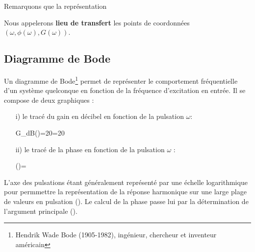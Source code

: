 Remarquons que la représentation 

Nous appelerons \textbf{lieu de transfert} les points de coordonnées $(\omega, \phi(\omega),G(\omega))$.



\subsection{Diagramme de Bode}
Un diagramme de Bode\footnote{Hendrik Wade Bode (1905-1982), ingénieur, chercheur 
et inventeur américain} permet de représenter le comportement fréquentielle 
d'un système quelconque en fonction de la fréquence d'excitation en entrée.
Il se compose de deux graphiques :
\begin{itemize}
    \item[i)] le tracé du gain en décibel en fonction de la pulsation $\omega$:
        \begin{bequation} 
        G_{dB}(\omega)=20=20 
        \end{bequation}
    \item[ii)] le tracé de la phase en fonction de la pulsation $\omega$ :
        \begin{bequation} 
        \phi(\omega)=
        \end{bequation}
\end{itemize}
L'axe des pulsations étant généralement représenté par une échelle logarithmique 
pour permmettre la représentation de la réponse harmonique sur une large plage de valeurs en pulsation
(). Le calcul de la phase passe lui par la détermination 
de l'argument principale ().

